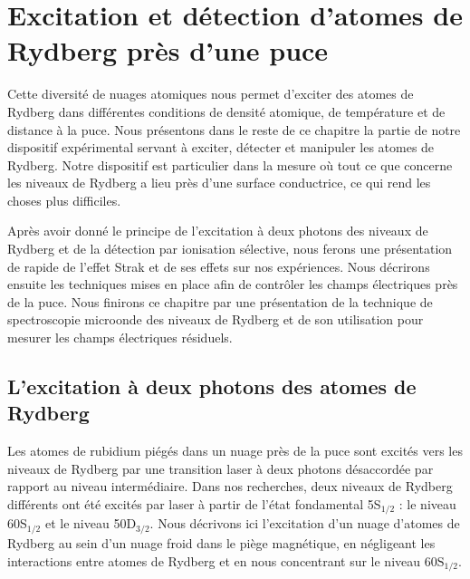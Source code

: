 \section{Excitation et détection d'atomes de Rydberg près d'une puce}

\noindent Cette diversité de nuages atomiques nous permet d'exciter des atomes de Rydberg dans différentes conditions de densité atomique, de température et de distance à la puce.
Nous présentons dans le reste de ce chapitre la partie de notre dispositif expérimental servant à exciter, détecter et manipuler les atomes de Rydberg.
Notre dispositif est particulier dans la mesure où tout ce que concerne les niveaux de Rydberg a lieu près d'une surface conductrice, ce qui rend les choses plus difficiles.

Après avoir donné le principe de l'excitation à deux photons des niveaux de Rydberg et de la détection par ionisation sélective, nous ferons une présentation de rapide de l'effet Strak et de ses effets sur nos expériences.
Nous décrirons ensuite les techniques mises en place afin de contrôler les champs électriques près de la puce.
Nous finirons ce chapitre par une présentation de la technique de spectroscopie microonde des niveaux de Rydberg et de son utilisation pour mesurer les champs électriques résiduels.

	\subsection{L'excitation à deux photons des atomes de Rydberg}

\noindent Les atomes de rubidium piégés dans un nuage près de la puce sont excités vers les niveaux de Rydberg par une transition laser à deux photons désaccordée par rapport au niveau intermédiaire.
Dans nos recherches, deux niveaux de Rydberg différents ont été excités par laser à partir de l'état fondamental 5S$_{1/2}$ : le niveau 60S$_{1/2}$ et le niveau 50D$_{3/2}$.
Nous décrivons ici l'excitation d'un nuage d'atomes de Rydberg au sein d'un nuage froid dans le piège magnétique, en négligeant les interactions entre atomes de Rydberg et en nous concentrant sur le niveau $\mathrm{60S_{1/2}}$.


